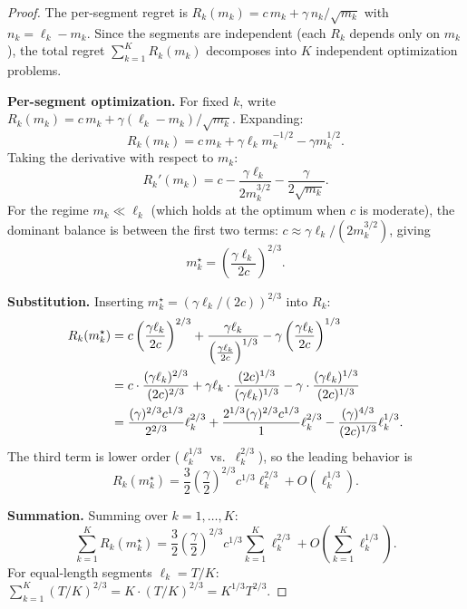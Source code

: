 \documentclass{article}
\begin{document}
\begin{proof}
The per-segment regret is $R_k(m_k) = c\, m_k + \gamma\, n_k / \sqrt{m_k}$ with $n_k = \ell_k - m_k$.  Since the segments are independent (each $R_k$ depends only on $m_k$), the total regret $\sum_{k=1}^K R_k(m_k)$ decomposes into $K$ independent optimization problems.

\textbf{Per-segment optimization.}
For fixed $k$, write $R_k(m_k) = c\, m_k + \gamma(\ell_k - m_k)/\sqrt{m_k}$.  Expanding:
\[
R_k(m_k) = c\, m_k + \gamma \ell_k m_k^{-1/2} - \gamma m_k^{1/2}.
\]
Taking the derivative with respect to $m_k$:
\[
R_k'(m_k) = c - \frac{\gamma \ell_k}{2 m_k^{3/2}} - \frac{\gamma}{2\sqrt{m_k}}.
\]
For the regime $m_k \ll \ell_k$ (which holds at the optimum when $c$ is moderate), the dominant balance is between the first two terms: $c \approx \gamma \ell_k / (2 m_k^{3/2})$, giving
\[
m_k^\star = \left(\frac{\gamma \ell_k}{2c}\right)^{2/3}.
\]

\textbf{Substitution.}
Inserting $m_k^\star = (\gamma \ell_k/(2c))^{2/3}$ into $R_k$:
\begin{align}
R_k(m_k^\star) &= c\left(\frac{\gamma \ell_k}{2c}\right)^{2/3}
+ \frac{\gamma \ell_k}{\left(\frac{\gamma \ell_k}{2c}\right)^{1/3}}
- \gamma \left(\frac{\gamma \ell_k}{2c}\right)^{1/3} \notag \\
&= c \cdot \frac{(\gamma \ell_k)^{2/3}}{(2c)^{2/3}}
+ \gamma \ell_k \cdot \frac{(2c)^{1/3}}{(\gamma \ell_k)^{1/3}}
- \gamma \cdot \frac{(\gamma \ell_k)^{1/3}}{(2c)^{1/3}} \notag \\
&= \frac{(\gamma)^{2/3} c^{1/3}}{2^{2/3}} \ell_k^{2/3}
+ \frac{2^{1/3} (\gamma)^{2/3} c^{1/3}}{1} \ell_k^{2/3}
- \frac{(\gamma)^{4/3}}{(2c)^{1/3}} \ell_k^{1/3}. \notag
\end{align}
The third term is lower order ($\ell_k^{1/3}$ vs.\ $\ell_k^{2/3}$), so the leading behavior is
\[
R_k(m_k^\star) = \frac{3}{2}\left(\frac{\gamma}{2}\right)^{2/3} c^{1/3} \ell_k^{2/3} + O(\ell_k^{1/3}).
\]

\textbf{Summation.}
Summing over $k = 1, \ldots, K$:
\[
\sum_{k=1}^K R_k(m_k^\star) = \frac{3}{2}\left(\frac{\gamma}{2}\right)^{2/3} c^{1/3} \sum_{k=1}^K \ell_k^{2/3} + O\!\left(\sum_{k=1}^K \ell_k^{1/3}\right).
\]
For equal-length segments $\ell_k = T/K$:
$\sum_{k=1}^K (T/K)^{2/3} = K \cdot (T/K)^{2/3} = K^{1/3} T^{2/3}$.
\end{proof}

\end{document}
